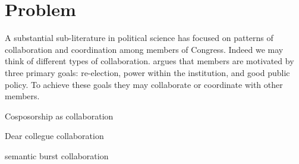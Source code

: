 \section{Problem}
A substantial sub-literature in political science has focused on patterns of collaboration and coordination among members of Congress. Indeed we may think of different types of collaboration. \cite{fenno1978home} argues that members are motivated by three primary goals: re-election, power within the institution, and good public policy. To achieve these goals they may collaborate or coordinate with other members.

Cosposorship as collaboration

Dear collegue collaboration

semantic burst collaboration



